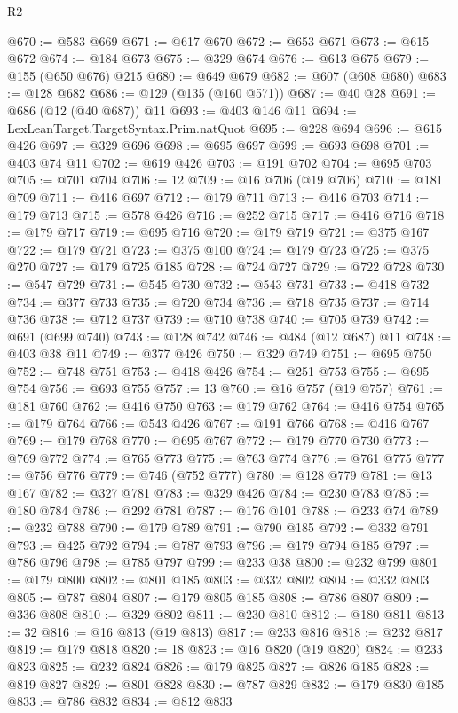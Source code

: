 \begin{lexlean}{R2}
\begin{coremodule}
@670 := @583 @669
@671 := @617 @670
@672 := @653 @671
@673 := @615 @672
@674 := @184 @673
@675 := @329 @674
@676 := @613 @675
@679 := @155 (@650 @676) @215
@680 := @649 @679
@682 := @607 (@608 @680)
@683 := @128 @682
@686 := @129 (@135 (@160 @571))
@687 := @40 @28
@691 := @686 (@12 (@40 @687)) @11
@693 := @403 @146 @11
@694 := LexLeanTarget.TargetSyntax.Prim.natQuot
@695 := @228 @694
@696 := @615 @426
@697 := @329 @696
@698 := @695 @697
@699 := @693 @698
@701 := @403 @74 @11
@702 := @619 @426
@703 := @191 @702
@704 := @695 @703
@705 := @701 @704
@706 := 12
@709 := @16 @706 (@19 @706)
@710 := @181 @709
@711 := @416 @697
@712 := @179 @711
@713 := @416 @703
@714 := @179 @713
@715 := @578 @426
@716 := @252 @715
@717 := @416 @716
@718 := @179 @717
@719 := @695 @716
@720 := @179 @719
@721 := @375 @167
@722 := @179 @721
@723 := @375 @100
@724 := @179 @723
@725 := @375 @270
@727 := @179 @725 @185
@728 := @724 @727
@729 := @722 @728
@730 := @547 @729
@731 := @545 @730
@732 := @543 @731
@733 := @418 @732
@734 := @377 @733
@735 := @720 @734
@736 := @718 @735
@737 := @714 @736
@738 := @712 @737
@739 := @710 @738
@740 := @705 @739
@742 := @691 (@699 @740)
@743 := @128 @742
@746 := @484 (@12 @687) @11
@748 := @403 @38 @11
@749 := @377 @426
@750 := @329 @749
@751 := @695 @750
@752 := @748 @751
@753 := @418 @426
@754 := @251 @753
@755 := @695 @754
@756 := @693 @755
@757 := 13
@760 := @16 @757 (@19 @757)
@761 := @181 @760
@762 := @416 @750
@763 := @179 @762
@764 := @416 @754
@765 := @179 @764
@766 := @543 @426
@767 := @191 @766
@768 := @416 @767
@769 := @179 @768
@770 := @695 @767
@772 := @179 @770 @730
@773 := @769 @772
@774 := @765 @773
@775 := @763 @774
@776 := @761 @775
@777 := @756 @776
@779 := @746 (@752 @777)
@780 := @128 @779
@781 := @13 @167
@782 := @327 @781
@783 := @329 @426
@784 := @230 @783
@785 := @180 @784
@786 := @292 @781
@787 := @176 @101
@788 := @233 @74
@789 := @232 @788
@790 := @179 @789
@791 := @790 @185
@792 := @332 @791
@793 := @425 @792
@794 := @787 @793
@796 := @179 @794 @185
@797 := @786 @796
@798 := @785 @797
@799 := @233 @38
@800 := @232 @799
@801 := @179 @800
@802 := @801 @185
@803 := @332 @802
@804 := @332 @803
@805 := @787 @804
@807 := @179 @805 @185
@808 := @786 @807
@809 := @336 @808
@810 := @329 @802
@811 := @230 @810
@812 := @180 @811
@813 := 32
@816 := @16 @813 (@19 @813)
@817 := @233 @816
@818 := @232 @817
@819 := @179 @818
@820 := 18
@823 := @16 @820 (@19 @820)
@824 := @233 @823
@825 := @232 @824
@826 := @179 @825
@827 := @826 @185
@828 := @819 @827
@829 := @801 @828
@830 := @787 @829
@832 := @179 @830 @185
@833 := @786 @832
@834 := @812 @833

\end{coremodule}
\end{lexlean}
